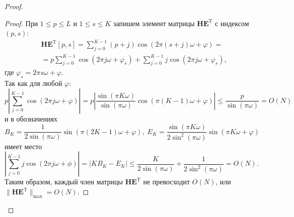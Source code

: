 \documentclass[specialist,
substylefile = spbu_report.rtx,
subf,href,colorlinks=true, 12pt]{disser}
\begin{document}
\begin{proof}
		\begin{proof}
			При $1\leqslant p \leqslant L$ и $1 \leqslant s \leqslant K$ запишем элемент матрицы $\mathbf{HE}^\mathrm{T}$ с индексом $(p, s)$:
			\begin{align*}
				&\mathbf{HE}^\mathrm{T}[p,s]=\sum_{j=0}^{K-1}(p+j)\cos(2\pi (s+j)\omega + \varphi)=\\
				&=p\sum_{j=0}^{K-1}\cos(2\pi j\omega + \varphi_s)+\sum_{j=0}^{K-1}j\cos(2\pi j\omega + \varphi_s),
			\end{align*}
			где $\varphi_s = 2\pi s\omega + \varphi$.
			\\
			Так как для любой $\varphi$:
			\begin{equation*}
				p\left|\sum_{j=0}^{K-1}\cos(2\pi j\omega + \varphi)\right| = p\left|\dfrac{\sin(\pi K\omega)}{\sin(\pi \omega)}\cos(\pi(K-1)\omega + \varphi)\right| \leqslant \dfrac{p}{\sin(\pi\omega)}=O(N)
			\end{equation*}
			и в обозначениях
			\begin{equation*}
				B_K = \dfrac{1}{2\sin(\pi\omega)}\sin(\pi(2K-1)\omega + \varphi),\; E_K = \dfrac{\sin(\pi K \omega)}{2\sin^2(\pi \omega)}\sin(\pi K\omega + \varphi)
			\end{equation*}
			имеет место
			\begin{equation*}
				\left|\sum_{j=0}^{K-1}j\cos(2\pi j\omega + \phi)\right|=\left|KB_K-E_K\right|\leqslant\dfrac{K}{2\sin(\pi\omega)} + \dfrac{1}{2\sin^2(\pi\omega)}=O(N).
			\end{equation*}
			Таким образом, каждый член матрицы $\mathbf{HE}^\mathrm{T}$ не превосходит $O(N)$, или $\|\mathbf{HE}^\mathrm{T}\|_{\max}=O(N)$.
		\end{proof}
		

\end{proof}
\end{document}

